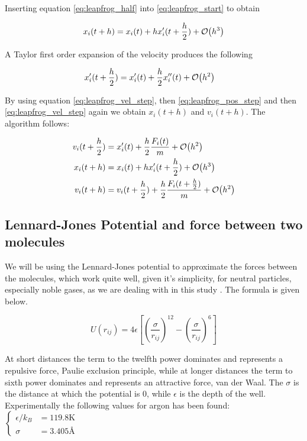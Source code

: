 \documentclass[11pt]{article}
\begin{document}
		\noindent Inserting equation \eqref{eq:leapfrog_half} into \eqref{eq:leapfrog_start} to obtain

		\begin{equation}
		x_{i}(t+h) = x_i(t) + hx_i'(t+ \frac{h}{2})+ \order{h^3} \label{eq:leapfrog_pos_step}
		\end{equation}

		\noindent A Taylor first order expansion of the velocity produces the following

		\begin{align}
			x'_i(t+\frac{h}{2}) &= x_i'(t)  + \frac{h}{2}x_i''(t) + \order{h^2} \label{eq:leapfrog_vel_step}
		\end{align}

		\noindent By using equation \eqref{eq:leapfrog_vel_step}, then \eqref{eq:leapfrog_pos_step} and then \eqref{eq:leapfrog_vel_step} again we obtain \(x_i(t+h)\) and \(v_i(t+h)\). The algorithm follows:

		\begin{align*}
		v_i(t+\frac{h}{2}) &= x_i'(t)  + \frac{h}{2}\frac{F_i(t)}{m} + \order{h^2} 
		\\
		x_i(t+h) &= x_i(t) + hx_i'(t+ \frac{h} {2} ) + \order{h ^ 3}
		\\
		v_i(t+h) &= v_i(t+\frac{h}{2})  +  \frac{h}{2}\frac{F_i(t+ \frac{h}{2})}{m} + \order{h^2} 
		\end{align*}


	\subsection{Lennard-Jones Potential and force between two molecules}
		We will be using the Lennard-Jones potential to approximate the forces between the molecules, which work quite well, given it's simplicity, for neutral particles, especially noble gases, as we are dealing with in this study \cite{Wiki}. The formula is given below.

		\[
		U(r_{ij}) = 4 \epsilon \left[ \left( \frac{\sigma}{r_{ij}} \right)^{12} - \left( \frac{\sigma}{r_{ij}} \right)^{6} \right]
		\]
		
		At short distances the term to the twelfth power dominates and represents a repulsive force, Paulie exclusion principle, while at longer distances the term to sixth power dominates and represents an attractive force, van der Waal. The \(\sigma \) is the distance at which the potential is \(0\), while \( \epsilon  \) is the depth of the well. \\
		Experimentally the following values for argon has been found: 
		\(
		\begin{cases}
		\epsilon/k_B &= 119.8 \text{K} 
		\\
		\sigma &= 3.405 \text{\AA}
		\end{cases}
		\)
\end{document}
